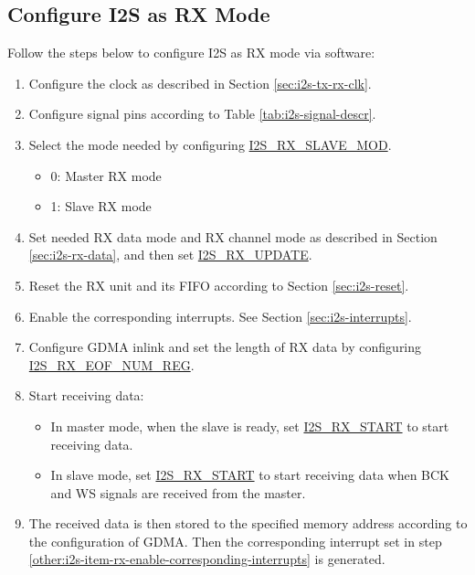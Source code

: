 \documentclass[main\_\_EN.tex]{subfiles}
\begin{document}
\subsection{Configure I2S as RX Mode}\label{sec:i2s-configure-i2s-rx-mode}

Follow the steps below to configure I2S as RX mode via software:

\begin{enumerate}
    \item Configure the clock as described in Section \ref{sec:i2s-tx-rx-clk}.
    \item Configure signal pins according to Table \ref{tab:i2s-signal-descr}.
    \item Select the mode needed by configuring \hyperref[fielddesc:I2SRXSLAVEMOD]{I2S\_RX\_SLAVE\_MOD}.
    \begin{itemize}
        \item 0: Master RX mode
        \item 1: Slave RX mode
    \end{itemize}
    \item Set needed RX data mode and RX channel mode as described in Section \ref{sec:i2s-rx-data}, and then set \hyperref[fielddesc:I2SRXUPDATE]{I2S\_RX\_UPDATE}.
    \item Reset the RX unit and its FIFO according to Section \ref{sec:i2s-reset}.
    \item Enable the corresponding interrupts. See Section \ref{sec:i2s-interrupts}.\label{other:i2s-item-rx-enable-corresponding-interrupts}
    \item Configure GDMA inlink and set the length of RX data by configuring \hyperref[regdesc:I2SRXEOFNUMREG]{I2S\_RX\_EOF\_NUM\_REG}.
    \item Start receiving data:
    \begin{itemize}
        \item In master mode, when the slave is ready, set \hyperref[fielddesc:I2SRXSTART]{I2S\_RX\_START} to start receiving data.
        \item In slave mode, set  \hyperref[fielddesc:I2SRXSTART]{I2S\_RX\_START} to start receiving data when BCK and WS signals are received from the master.
    \end{itemize}
    \item The received data is then stored to the specified memory address according to the configuration of GDMA. Then the corresponding interrupt set in step \ref{other:i2s-item-rx-enable-corresponding-interrupts} is generated.
\end{enumerate}
\end{document}
